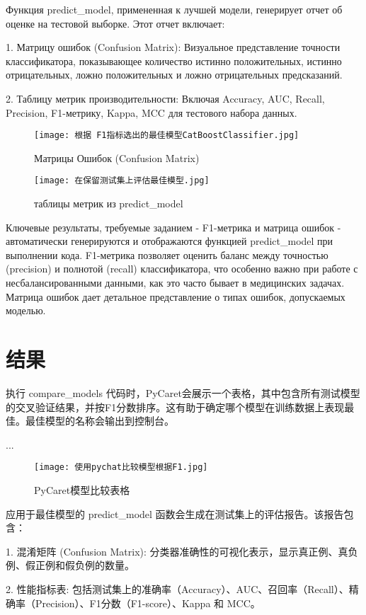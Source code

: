 \documentclass{article}
\providecommand{\pcsync}{\par\vspace{\baselineskip}}
\begin{document}
\begin{paracol}{2}
Функция predict_model, примененная к лучшей модели, генерирует отчет об оценке на тестовой выборке. Этот отчет включает:

1. Матрицу ошибок (Confusion Matrix): Визуальное представление точности классификатора, показывающее количество истинно положительных, истинно отрицательных, ложно положительных и ложно отрицательных предсказаний.

2. Таблицу метрик производительности: Включая Accuracy, AUC, Recall, Precision, F1-метрику, Kappa, MCC для тестового набора данных.
\begin{figure}[H]
    \centering
    \texttt{[image: 根据 F1指标选出的最佳模型CatBoostClassifier.jpg]}
    \caption{Матрицы Ошибок (Confusion Matrix)}
    \label{fig:enter-label}
\end{figure}
\begin{figure}[H]
    \centering
    \texttt{[image: 在保留测试集上评估最佳模型.jpg]}
    \caption{таблицы метрик из predict_model}
    \label{fig:enter-label}
\end{figure}
Ключевые результаты, требуемые заданием - F1-метрика и матрица ошибок - автоматически генерируются и отображаются функцией predict_model при выполнении кода. F1-метрика позволяет оценить баланс между точностью (precision) и полнотой (recall) классификатора, что особенно важно при работе с несбалансированными данными, как это часто бывает в медицинских задачах. Матрица ошибок дает детальное представление о типах ошибок, допускаемых моделью.
\switchcolumn

\section{结果}
\pcsync
执行 compare_models 代码时，PyCaret会展示一个表格，其中包含所有测试模型的交叉验证结果，并按F1分数排序。这有助于确定哪个模型在训练数据上表现最佳。最佳模型的名称会输出到控制台。

...

\begin{figure}[H]
    \centering
    \texttt{[image: 使用pychat比较模型根据F1.jpg]}
    \caption{PyCaret模型比较表格}
    \label{fig:enter-label}
\end{figure}
应用于最佳模型的 predict_model 函数会生成在测试集上的评估报告。该报告包含：

1. 混淆矩阵 (Confusion Matrix): 分类器准确性的可视化表示，显示真正例、真负例、假正例和假负例的数量。

2. 性能指标表: 包括测试集上的准确率（Accuracy）、AUC、召回率（Recall）、精确率（Precision）、F1分数（F1-score）、Kappa 和 MCC。


\end{paracol}
\end{document}
